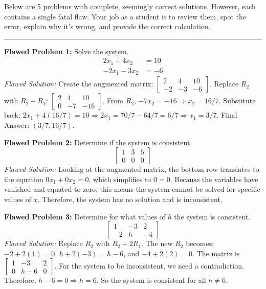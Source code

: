 \documentclass[11pt]{article}
\begin{document}
Below are 5 problems with complete, seemingly correct solutions. However, each contains a single fatal flaw. Your job as a student is to review them, spot the error, explain why it's wrong, and provide the correct calculation.

\hrule
\vspace{0.5cm}

\textbf{Flawed Problem 1:} Solve the system.
\begin{align*}
    2x_1 + 4x_2 &= 10 \\
    -2x_1 - 3x_2 &= -6
\end{align*}
\textit{Flawed Solution:} 
Create the augmented matrix: $\begin{bmatrix} 2 & 4 & 10 \\ -2 & -3 & -6 \end{bmatrix}$. 
Replace $R_2$ with $R_2 - R_1$: 
$\begin{bmatrix} 2 & 4 & 10 \\ 0 & -7 & -16 \end{bmatrix}$.
From $R_2$, $-7x_2 = -16 \Rightarrow x_2 = 16/7$.
Substitute back: $2x_1 + 4(16/7) = 10 \Rightarrow 2x_1 = 70/7 - 64/7 = 6/7 \Rightarrow x_1 = 3/7$.
Final Answer: $(3/7, 16/7)$.

\vspace{0.3cm}
\textbf{Flawed Problem 2:} Determine if the system is consistent.
\[
\begin{bmatrix}
1 & 3 & 5 \\
0 & 0 & 0
\end{bmatrix}
\]
\textit{Flawed Solution:} 
Looking at the augmented matrix, the bottom row translates to the equation $0x_1 + 0x_2 = 0$, which simplifies to $0 = 0$. Because the variables have vanished and equated to zero, this means the system cannot be solved for specific values of $x$. Therefore, the system has no solution and is inconsistent.

\vspace{0.3cm}
\textbf{Flawed Problem 3:} Determine for what values of $h$ the system is consistent.
\[
\begin{bmatrix}
1 & -3 & 2 \\
-2 & h & -4
\end{bmatrix}
\]
\textit{Flawed Solution:}
Replace $R_2$ with $R_2 + 2R_1$.
The new $R_2$ becomes: $-2 + 2(1) = 0$, $h + 2(-3) = h - 6$, and $-4 + 2(2) = 0$.
The matrix is $\begin{bmatrix} 1 & -3 & 2 \\ 0 & h-6 & 0 \end{bmatrix}$.
For the system to be inconsistent, we need a contradiction. Therefore, $h - 6 = 0 \Rightarrow h = 6$. So the system is consistent for all $h \neq 6$.
\end{document}
